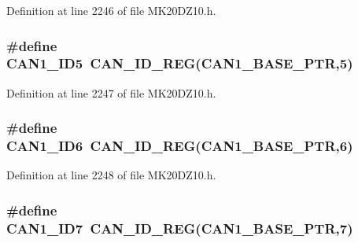 Definition at line 2246 of file M\+K20\+D\+Z10.\+h.

\subsubsection[{\texorpdfstring{C\+A\+N1\+\_\+\+I\+D5}{CAN1_ID5}}]{\setlength{\rightskip}{0pt plus 5cm}\#define C\+A\+N1\+\_\+\+I\+D5~{\bf C\+A\+N\+\_\+\+I\+D\+\_\+\+R\+EG}({\bf C\+A\+N1\+\_\+\+B\+A\+S\+E\+\_\+\+P\+TR},5)}\hypertarget{group___c_a_n___register___accessor___macros_ga9137de44d23b6a48aa56f454b4cab705}{}\label{group___c_a_n___register___accessor___macros_ga9137de44d23b6a48aa56f454b4cab705}


Definition at line 2247 of file M\+K20\+D\+Z10.\+h.

\subsubsection[{\texorpdfstring{C\+A\+N1\+\_\+\+I\+D6}{CAN1_ID6}}]{\setlength{\rightskip}{0pt plus 5cm}\#define C\+A\+N1\+\_\+\+I\+D6~{\bf C\+A\+N\+\_\+\+I\+D\+\_\+\+R\+EG}({\bf C\+A\+N1\+\_\+\+B\+A\+S\+E\+\_\+\+P\+TR},6)}\hypertarget{group___c_a_n___register___accessor___macros_ga777cc0f52a9f476cd4bb5fecc9effc9c}{}\label{group___c_a_n___register___accessor___macros_ga777cc0f52a9f476cd4bb5fecc9effc9c}


Definition at line 2248 of file M\+K20\+D\+Z10.\+h.

\subsubsection[{\texorpdfstring{C\+A\+N1\+\_\+\+I\+D7}{CAN1_ID7}}]{\setlength{\rightskip}{0pt plus 5cm}\#define C\+A\+N1\+\_\+\+I\+D7~{\bf C\+A\+N\+\_\+\+I\+D\+\_\+\+R\+EG}({\bf C\+A\+N1\+\_\+\+B\+A\+S\+E\+\_\+\+P\+TR},7)}\hypertarget{group___c_a_n___register___accessor___macros_gaa0b073acd5919e222498c8aede71927c}{}\label{group___c_a_n___register___accessor___macros_gaa0b073acd5919e222498c8aede71927c}


